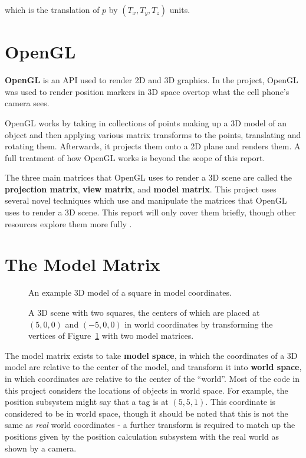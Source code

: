  which is the translation of $p$ by $(T_x, T_y, T_z)$ units.
 
\section{OpenGL}
\textbf{OpenGL} is an API used to render 2D and 3D graphics. In the project, OpenGL was used to render position markers in 3D space overtop what the cell phone's camera sees.

OpenGL works by taking in collections of points making up a 3D model of an object and then applying various matrix transforms to the points, translating and rotating them. Afterwards, it projects them onto a 2D plane and renders them. A full treatment of how OpenGL works is beyond the scope of this report.

The three main matrices that OpenGL uses to render a 3D scene are called the \textbf{projection matrix}, \textbf{view matrix}, and \textbf{model matrix}. This project uses several novel techniques which use and manipulate the matrices that OpenGL uses to render a 3D scene. This report will only cover them briefly, though other resources explore them more fully \cite{CodingLabs}.

\section{The Model Matrix}
\begin{figure}
	\centering
	
	\decoRule
	\caption{An example 3D model of a square in model coordinates.}
	\label{fig:ModelExample}
\end{figure}
\begin{figure}
	\centering
	
	\decoRule
	\caption{A 3D scene with two squares, the centers of which are placed at $(5, 0, 0)$ and $(-5, 0, 0)$ in world coordinates by transforming the vertices of Figure~\ref{fig:ModelExample} with two model matrices.}
	\label{fig:ModelMatrixExample}
\end{figure}

The model matrix exists to take \textbf{model space}, in which the coordinates of a 3D model are relative to the center of the model, and transform it into \textbf{world space}, in which coordinates are relative to the center of the ``world''. Most of the code in this project considers the locations of objects in world space. For example, the position subsystem might say that a tag is at $(5, 5, 1)$. This coordinate is considered to be in world space, though it should be noted that this is not the same as \emph{real} world coordinates - a further transform is required to match up the positions given by the position calculation subsystem with the real world as shown by a camera.

